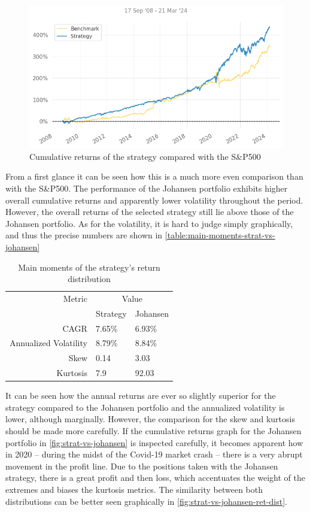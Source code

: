 \begin{figure}[ht]
    \includegraphics[width=\linewidth]{assets/strat-vs-johansen.png}
    \caption{Cumulative returns of the strategy compared with the S\&P500}
    \label{fig:strat-vs-johansen}
\end{figure}

From a first glance it can be seen how this is a much more even comparison than with the S\&P500. The performance of the Johansen portfolio exhibits higher overall cumulative returns and apparently lower volatility throughout the period. However, the overall returns of the selected strategy still lie above those of the Johansen portfolio. As for the volatility, it is hard to judge simply graphically, and thus the precise numbers are shown in \autoref{table:main-moments-strat-vs-johansen}

\begin{table}[ht]
    \centering
    \begin{tabular}{rll}
        \toprule
        Metric & \multicolumn{2}{c}{Value} \\ 
        \cmidrule(lr){2-3}
            & Strategy & Johansen \\
        \midrule
        CAGR & 7.65\% & 6.93\% \\
        Annualized Volatility & 8.79\% & 8.84\% \\
        Skew & 0.14 & 3.03 \\
        Kurtosis & 7.9 & 92.03 \\
        \bottomrule
    \end{tabular}
    \caption{Main moments of the strategy's return distribution}
    \label{table:main-moments-strat-vs-johansen}
\end{table}

It can be seen how the annual returns are ever so slightly superior for the strategy compared to the Johansen portfolio and the annualized volatility is lower, although marginally. However, the comparison for the skew and kurtosis should be made more carefully. If the cumulative returns graph for the Johansen portfolio in \autoref{fig:strat-vs-johansen} is inspected carefully, it becomes apparent how in 2020 -- during the midst of the Covid-19 market crash -- there is a very abrupt movement in the profit line. Due to the positions taken with the Johansen strategy, there is a great profit and then loss, which accentuates the weight of the extremes and biases the kurtosis metrics. The similarity between both distributions can be better seen graphically in \autoref{fig:strat-vs-johansen-ret-dist}.

